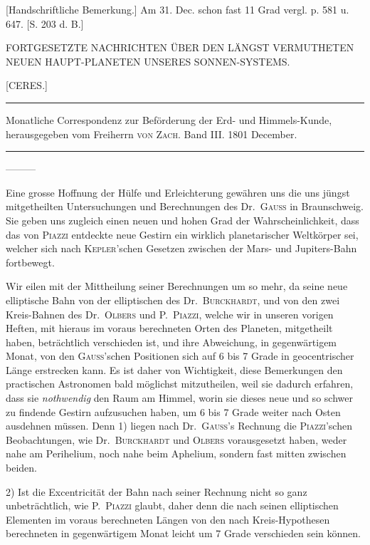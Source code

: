 \expandafter\def\csname HistoricalNoteText16\endcsname{[Handschriftliche Bemerkung.] Am 31. Dec. schon fast 11 Grad vergl. p. 581 u. 647. [S. 203 d. B.]}
\clearpage{}%
\fancyhead[L]{\small [CERES.]}
\begin{center}
{\small FORTGESETZTE NACHRICHTEN ÜBER DEN LÄNGST VERMUTHETEN NEUEN HAUPT-PLANETEN UNSERES SONNEN-SYSTEMS.\par}
[CERES.]\par
\medskip\hrule\medskip
{\small Monatliche Correspondenz zur Beförderung der Erd- und Himmels-Kunde, herausgegeben vom Freiherrn \textsc{von Zach}. Band III. 1801 December.\par}
\medskip\hrule
\end{center}\medskip
\noindent —\quad —\quad —\par
Eine grosse Hoffnung der Hülfe und Erleichterung gewähren uns die uns jüngst mitgetheilten Untersuchungen und Berechnungen des Dr.\ \textsc{Gauss} in Braunschweig. Sie geben uns zugleich einen neuen und hohen Grad der Wahrscheinlichkeit, dass das von \textsc{Piazzi} entdeckte neue Gestirn ein wirklich planetarischer Weltkörper sei, welcher sich nach \textsc{Kepler}'schen Gesetzen zwischen der Mars- und Jupiters-Bahn fortbewegt.

Wir eilen mit der Mittheilung seiner Berechnungen um so mehr, da seine neue elliptische Bahn von der elliptischen des Dr.\ \textsc{Burckhardt}, und von den zwei Kreis-Bahnen des Dr.\ \textsc{Olbers} und P.\ \textsc{Piazzi}, welche wir in unseren vorigen Heften, mit hieraus im voraus berechneten Orten des Planeten, mitgetheilt haben, beträchtlich verschieden ist, und ihre Abweichung, in gegenwärtigem Monat, von den \textsc{Gauss}'schen Positionen sich auf 6 bis 7 Grade in geocentrischer Länge erstrecken kann. Es ist daher von Wichtigkeit, diese Bemerkungen den practischen Astronomen bald möglichst mitzutheilen, weil sie dadurch erfahren, dass sie \textit{nothwendig} den Raum am Himmel, worin sie dieses neue und so schwer zu findende Gestirn aufzusuchen haben, um 6 bis 7 Grade weiter nach Osten ausdehnen müssen. Denn 1) liegen nach Dr.\ \textsc{Gauss}'s Rechnung die \textsc{Piazzi}'schen Beobachtungen, wie Dr.\ \textsc{Burckhardt} und \textsc{Olbers} vorausgesetzt haben, weder nahe am Perihelium, noch nahe beim Aphelium, sondern fast mitten zwischen beiden.

2) Ist die Excentricität der Bahn nach seiner Rechnung nicht so ganz unbeträchtlich, wie P.\ \textsc{Piazzi} glaubt, daher denn die nach seinen elliptischen Elementen im voraus berechneten Längen von den nach Kreis-Hypothesen berechneten in gegenwärtigem Monat leicht um 7 Grade verschieden sein können.

